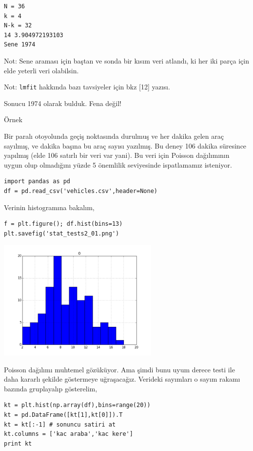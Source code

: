 \documentclass[12pt,fleqn]{article}\usepackage{../../common}
\begin{document}
\begin{verbatim}
N = 36
k = 4
N-k = 32
14 3.904972193103
Sene 1974
\end{verbatim}

Not: Sene araması için baştan ve sonda bir kısım veri atlandı, ki her iki
parça için elde yeterli veri olabilsin. 

Not: \verb!lmfit! hakkında bazı tavsiyeler için bkz [12] yazısı.

Sonucu 1974 olarak bulduk. Fena değil!


Örnek

Bir paralı otoyolunda geçiş noktasında durulmuş ve her dakika gelen araç
sayılmış, ve dakika başına bu araç sayısı yazılmış. Bu deney 106 dakika
süresince yapılmış (elde 106 satırlı bir veri var yani). Bu veri için
Poisson dağılımının uygun olup olmadığını yüzde 5 önemlilik seviyesinde
ispatlamamız isteniyor.

\begin{verbatim}
import pandas as pd
df = pd.read_csv('vehicles.csv',header=None)
\end{verbatim}

Verinin histogramına bakalım,

\begin{verbatim}
f = plt.figure(); df.hist(bins=13)
plt.savefig('stat_tests2_01.png')
\end{verbatim}

\includegraphics[height=6cm]{stat_tests2_01.png}

Poisson dağılımı muhtemel gözüküyor. Ama şimdi bunu uyum derece testi ile
daha kararlı şekilde göstermeye uğraşacağız. Verideki sayımları o sayım
rakamı bazında gruplayalıp gösterelim,

\begin{verbatim}
kt = plt.hist(np.array(df),bins=range(20))
kt = pd.DataFrame([kt[1],kt[0]]).T
kt = kt[:-1] # sonuncu satiri at
kt.columns = ['kac araba','kac kere']
print kt
\end{verbatim}
\end{document}

